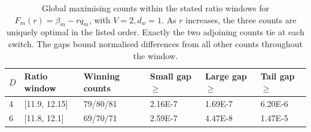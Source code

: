 \begin{table}[htbp]
\centering
\caption{Global maximising counts within the stated ratio windows for $F_m(r)=\beta_m-rq_m$, with $V=2,d_w=1$. As $r$ increases, the three counts are uniquely optimal in the listed order. Exactly the two adjoining counts tie at each switch. The gaps bound normalised differences from all other counts throughout the window.}
\label{tab:transition_phases}
\begin{tabular}{llllll}
\toprule
$D$ & Ratio window & Winning counts & Small gap $\geq$ & Large gap $\geq$ & Tail gap $\geq$ \\
\midrule
4 & [11.9, 12.15] & 79/80/81 & 2.16E-7 & 1.69E-7 & 6.20E-6 \\
6 & [11.8, 12.1] & 69/70/71 & 2.59E-7 & 4.47E-8 & 1.47E-5 \\
\bottomrule
\end{tabular}
\end{table}

